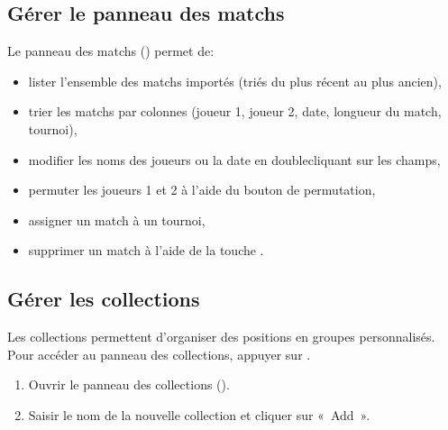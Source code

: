 \documentclass[letterpaper,10pt,french]{sphinxmanual}
\begin{document}
\subsection{Gérer le panneau des matchs}
\label{\detokenize{guide_utilisateur:gerer-le-panneau-des-matchs}}
\sphinxAtStartPar
Le panneau des matchs () permet de:
\begin{itemize}
\item {} 
\sphinxAtStartPar
lister l’ensemble des matchs importés (triés du plus récent au plus ancien),

\item {} 
\sphinxAtStartPar
trier les matchs par colonnes (joueur 1, joueur 2, date, longueur du match,
tournoi),

\item {} 
\sphinxAtStartPar
modifier les noms des joueurs ou la date en double\sphinxhyphen{}cliquant sur les champs,

\item {} 
\sphinxAtStartPar
permuter les joueurs 1 et 2 à l’aide du bouton de permutation,

\item {} 
\sphinxAtStartPar
assigner un match à un tournoi,

\item {} 
\sphinxAtStartPar
supprimer un match à l’aide de la touche .

\end{itemize}


\subsection{Gérer les collections}
\label{\detokenize{guide_utilisateur:gerer-les-collections}}
\sphinxAtStartPar
Les collections permettent d’organiser des positions en groupes personnalisés.
Pour accéder au panneau des collections, appuyer sur .

\sphinxAtStartPar
{}
\begin{enumerate}
%
\item {} 
\sphinxAtStartPar
Ouvrir le panneau des collections ().

\item {} 
\sphinxAtStartPar
Saisir le nom de la nouvelle collection et cliquer sur « Add ».

\end{enumerate}
\end{document}
